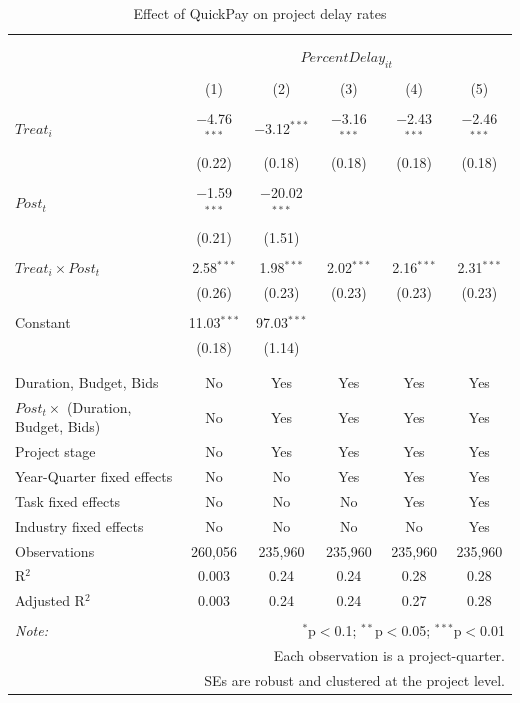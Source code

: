\documentclass[
]{article}
\begin{document}
\begin{table}[H] \centering 
  \caption{Effect of QuickPay on project delay rates} 
  \label{} 
\small 
\begin{tabular}{@{\extracolsep{-2pt}}lccccc} 
\\[-1.8ex]\hline 
\hline \\[-1.8ex] 
\\[-1.8ex] & \multicolumn{5}{c}{$PercentDelay_{it}$} \\ 
\\[-1.8ex] & (1) & (2) & (3) & (4) & (5)\\ 
\hline \\[-1.8ex] 
 $Treat_i$ & $-$4.76$^{***}$ & $-$3.12$^{***}$ & $-$3.16$^{***}$ & $-$2.43$^{***}$ & $-$2.46$^{***}$ \\ 
  & (0.22) & (0.18) & (0.18) & (0.18) & (0.18) \\ 
  & & & & & \\ 
 $Post_t$ & $-$1.59$^{***}$ & $-$20.02$^{***}$ &  &  &  \\ 
  & (0.21) & (1.51) &  &  &  \\ 
  & & & & & \\ 
 $Treat_i \times Post_t$ & 2.58$^{***}$ & 1.98$^{***}$ & 2.02$^{***}$ & 2.16$^{***}$ & 2.31$^{***}$ \\ 
  & (0.26) & (0.23) & (0.23) & (0.23) & (0.23) \\ 
  & & & & & \\ 
 Constant & 11.03$^{***}$ & 97.03$^{***}$ &  &  &  \\ 
  & (0.18) & (1.14) &  &  &  \\ 
  & & & & & \\ 
\hline \\[-1.8ex] 
Duration, Budget, Bids & No & Yes & Yes & Yes & Yes \\ 
$Post_t \times$  (Duration, Budget, Bids) & No & Yes & Yes & Yes & Yes \\ 
Project stage & No & Yes & Yes & Yes & Yes \\ 
Year-Quarter fixed effects & No & No & Yes & Yes & Yes \\ 
Task fixed effects & No & No & No & Yes & Yes \\ 
Industry fixed effects & No & No & No & No & Yes \\ 
Observations & 260,056 & 235,960 & 235,960 & 235,960 & 235,960 \\ 
R$^{2}$ & 0.003 & 0.24 & 0.24 & 0.28 & 0.28 \\ 
Adjusted R$^{2}$ & 0.003 & 0.24 & 0.24 & 0.27 & 0.28 \\ 
\hline 
\hline \\[-1.8ex] 
\textit{Note:}  & \multicolumn{5}{r}{$^{*}$p$<$0.1; $^{**}$p$<$0.05; $^{***}$p$<$0.01} \\ 
 & \multicolumn{5}{r}{Each observation is a project-quarter.} \\ 
 & \multicolumn{5}{r}{SEs are robust and clustered at the project level.} \\ 
\end{tabular} 
\end{table}
\end{document}
